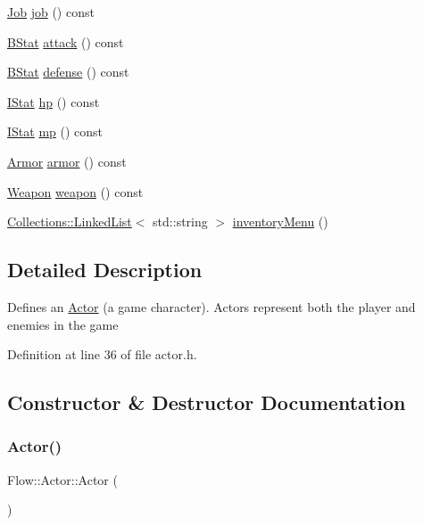 \begin{DoxyCompactItemize}
\item 
\hyperlink{namespace_flow_a05bb774db920847e46f3779aaef1b07b}{Job} \hyperlink{class_flow_1_1_actor_aac6046fc99b742a2307084b0b366c2ed}{job} () const
\item 
\hyperlink{class_flow_1_1_b_stat}{B\+Stat} \hyperlink{class_flow_1_1_actor_ab1b5a1e970f6721aeefe580e77d24ddb}{attack} () const
\item 
\hyperlink{class_flow_1_1_b_stat}{B\+Stat} \hyperlink{class_flow_1_1_actor_a70095802b129f53a2467e919e5e14c9b}{defense} () const
\item 
\hyperlink{class_flow_1_1_i_stat}{I\+Stat} \hyperlink{class_flow_1_1_actor_aaea76048a01d31bfc82a0eeb53c5cbdb}{hp} () const
\item 
\hyperlink{class_flow_1_1_i_stat}{I\+Stat} \hyperlink{class_flow_1_1_actor_a197cf5bc7b1b24c4e557adbdc6d9bbdf}{mp} () const
\item 
\hyperlink{class_flow_1_1_armor}{Armor} \hyperlink{class_flow_1_1_actor_a2b9ad51f3967a2b738f850440e4e56c0}{armor} () const
\item 
\hyperlink{class_flow_1_1_weapon}{Weapon} \hyperlink{class_flow_1_1_actor_ad22b99397cfccf1b2e1f9022fd59a322}{weapon} () const
\item 
\hyperlink{class_collections_1_1_linked_list}{Collections\+::\+Linked\+List}$<$ std\+::string $>$ \hyperlink{class_flow_1_1_actor_a57fa1f3f670561fbca7ad13ad6a6f35f}{inventory\+Menu} ()
\end{DoxyCompactItemize}


\subsection{Detailed Description}
Defines an \hyperlink{class_flow_1_1_actor}{Actor} (a game character). Actors represent both the player and enemies in the game 

Definition at line 36 of file actor.\+h.



\subsection{Constructor \& Destructor Documentation}
\hypertarget{class_flow_1_1_actor_a242b634b62029fb8fc3226e6dae85606}{}\label{class_flow_1_1_actor_a242b634b62029fb8fc3226e6dae85606} 
\subsubsection{\texorpdfstring{Actor()}{Actor()}}
{\footnotesize\ttfamily Flow\+::\+Actor\+::\+Actor (\begin{DoxyParamCaption}{ }\end{DoxyParamCaption})}

